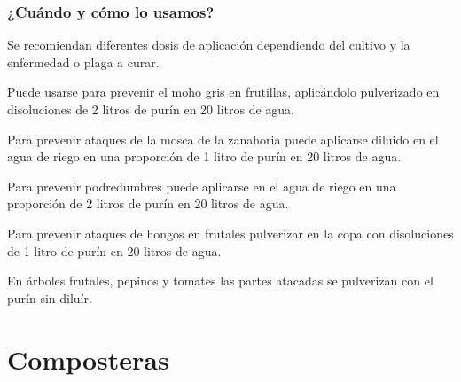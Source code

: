 \documentclass[../main.tex]{subfiles}
\begin{document}
\subsubsection{¿Cuándo y cómo lo usamos?}

Se recomiendan diferentes dosis de aplicación dependiendo del cultivo y la enfermedad o plaga a curar. 

Puede usarse para prevenir el moho gris en frutillas, aplicándolo pulverizado en disoluciones de 2 litros de purín en 20 litros de agua. 

Para prevenir ataques de la mosca de la zanahoria puede aplicarse diluido en el agua de riego en una proporción de 1 litro de purín en 20 litros de agua. 

Para prevenir podredumbres puede aplicarse en el agua de riego en una proporción de 2 litros de purín en 20 litros de agua. 

Para prevenir ataques de hongos en frutales pulverizar en la copa con disoluciones de 1 litro de purín en 20 litros de agua. 

En árboles frutales, pepinos y tomates las partes atacadas se pulverizan con el purín sin diluír.

\section{\color{black!50}Composteras}

\end{document}
